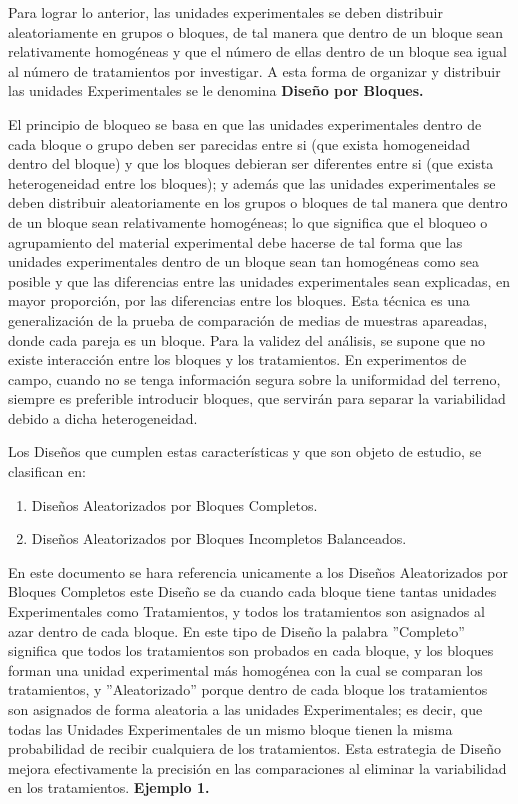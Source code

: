 \documentclass[12pt,letterpaper]{report}
\begin{document}
Para lograr lo anterior, las unidades experimentales se deben distribuir aleatoriamente
en grupos o bloques, de tal manera que dentro de un bloque sean relativamente homogéneas y
que el número de ellas dentro de un bloque sea igual al número de tratamientos por investigar.
A esta forma de organizar y distribuir las unidades Experimentales se le denomina \textbf{Diseño por Bloques.}

El principio de bloqueo se basa en que las unidades experimentales dentro de cada
bloque o grupo deben ser parecidas entre si (que exista homogeneidad dentro del bloque) y
que los bloques debieran ser diferentes entre si (que exista heterogeneidad entre los bloques);
y además que las unidades experimentales se deben distribuir aleatoriamente en los grupos o
bloques de tal manera que dentro de un bloque sean relativamente homogéneas; lo que
significa que el bloqueo o agrupamiento del material experimental debe hacerse de tal forma
que las unidades experimentales dentro de un bloque sean tan homogéneas como sea posible y
que las diferencias entre las unidades experimentales sean explicadas, en mayor proporción,
por las diferencias entre los bloques. Esta técnica es una generalización de la prueba de
comparación de medias de muestras apareadas, donde cada pareja es un bloque. Para la
validez del análisis, se supone que no existe interacción entre los bloques y los tratamientos.
En experimentos de campo, cuando no se tenga información segura sobre la
uniformidad del terreno, siempre es preferible introducir bloques, que servirán para separar la
variabilidad debido a dicha heterogeneidad.

Los Diseños que cumplen estas características y que son objeto de estudio, se
clasifican en:
\begin{enumerate}
  \item Diseños Aleatorizados por Bloques Completos.
  \item Diseños Aleatorizados por Bloques Incompletos Balanceados.
\end{enumerate}
En este documento se hara referencia unicamente a los Diseños Aleatorizados por Bloques Completos este Diseño se da cuando cada bloque tiene tantas unidades Experimentales como
Tratamientos, y todos los tratamientos son asignados al azar dentro de cada bloque.
En este tipo de Diseño la palabra ”Completo” significa que todos los tratamientos son
probados en cada bloque, y los bloques forman una unidad experimental más homogénea con
la cual se comparan los tratamientos, y ”Aleatorizado” porque dentro de cada bloque los
tratamientos son asignados de forma aleatoria a las unidades Experimentales; es decir, que
todas las Unidades Experimentales de un mismo bloque tienen la misma probabilidad de recibir
cualquiera de los tratamientos. Esta estrategia de Diseño mejora efectivamente la precisión en
las comparaciones al eliminar la variabilidad en los tratamientos.
\newpage
\textbf{Ejemplo 1.}
\end{document}
